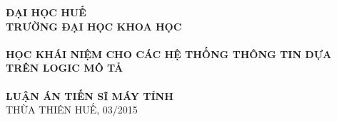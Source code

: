 \begin{titlepage}

\begin{center}
\vspace{-1.0cm}
\textsc{\textbf{ĐẠI HỌC HUẾ}}\\[0.0cm]
{\textbf{TRƯỜNG ĐẠI HỌC KHOA HỌC}}\\[4.0cm]

\textsc{\textbf{ }}\\[3.0cm]

{\fontsize{15}{15} \bfseries HỌC KHÁI NIỆM CHO CÁC HỆ THỐNG THÔNG TIN DỰA TRÊN LOGIC MÔ TẢ}\\[-0.1cm]
~\\[4.5cm]

\textsc{\large \textbf{LUẬN ÁN TIẾN SĨ MÁY TÍNH}}\\[0.5cm]

\vfill
THỪA THIÊN HUẾ, 03/2015
\vspace{-0.7cm}

\end{center}
\end{titlepage}

